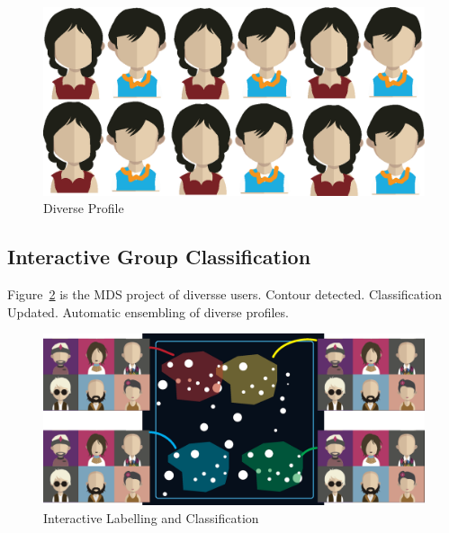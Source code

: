 \begin{figure}[htb!]
 \centering %
 \includegraphics[width=\columnwidth]{pictures/design_div}
 \caption{Diverse Profile}
 \label{fig:div_profile}
\end{figure}

\subsection{Interactive Group Classification}

Figure~\ref{fig:mds} is the MDS project of diversse users. Contour detected. Classification Updated. Automatic ensembling of diverse profiles. 


\begin{figure}[htb!]
 \centering %
 \includegraphics[width=\columnwidth]{pictures/mds}
 \caption{Interactive Labelling and Classification}
 \label{fig:mds}
\end{figure}